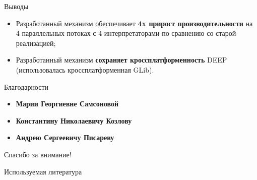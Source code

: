 \documentclass{beamer}
\begin{document}
\begin{frame}{Выводы}
\begin{itemize}
    \itemsep 2em
    \item Разработанный механизм обеспечивает
        \textbf{4x прирост производительности}
        на 4 параллельных потоках с 4 интерпретаторами по
        сравнению со старой реализацией;
    \item Разработанный механизм \textbf{сохраняет кроссплатформенность} DEEP
        (использовалась кроссплатформенная GLib).
\end{itemize}
\end{frame}

\begin{frame}{Благодарности}
    \begin{itemize}
        \itemsep 2em
        \item \textbf{Марии Георгиевне Самсоновой}
        \item \textbf{Константину Николаевичу Козлову}
        \item \textbf{Андрею Сергеевичу Писареву}
    \end{itemize}
    \bigskip

    \vfill
    \begin{center}
        \LARGE Спасибо за внимание!
    \end{center}
\end{frame}

\begin{frame}[t,allowframebreaks]{Используемая литература}
    \nocite{Kozlov11, Kozlov13, Storn95, pisarev2015tracker,
    GLib, zaharie2002parameter, fan2003trigonometric}
    
\end{frame}
\end{document}
